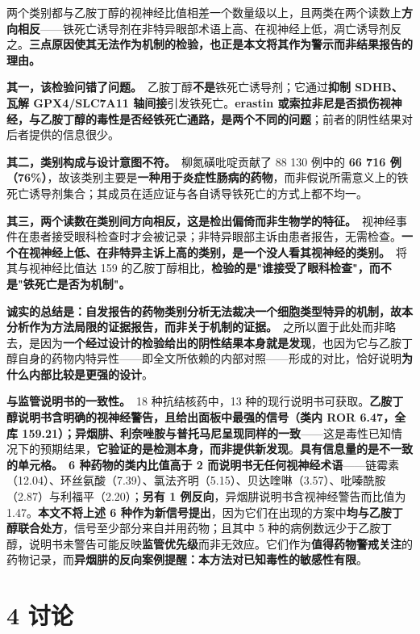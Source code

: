 \documentclass[UTF8,fontset=windows,11pt]{ctexart}
\begin{document}
两个类别都与乙胺丁醇的视神经比值相差一个数量级以上，且两类在两个读数上\textbf{方向相反}——铁死亡诱导剂在非特异眼部术语上高、在视神经上低，凋亡诱导剂反之。\textbf{三点原因使其无法作为机制的检验，也正是本文将其作为警示而非结果报告的理由。}

\textbf{其一，该检验问错了问题。}\ 乙胺丁醇\textbf{不是}铁死亡诱导剂；它通过\textbf{抑制 SDHB、瓦解 GPX4/SLC7A11 轴间接}引发铁死亡。\textbf{erastin 或索拉非尼是否损伤视神经，与乙胺丁醇的毒性是否经铁死亡通路，是两个不同的问题}；前者的阴性结果对后者提供的信息很少。

\textbf{其二，类别构成与设计意图不符。}\ 柳氮磺吡啶贡献了 88 130 例中的 \textbf{66 716 例（76\%）}，故该类别主要是\textbf{一种用于炎症性肠病的药物}，而非假说所需意义上的铁死亡诱导剂集合；其成员在适应证与各自诱导铁死亡的方式上都不均一。

\textbf{其三，两个读数在类别间方向相反，这是检出偏倚而非生物学的特征。}\ 视神经事件在患者接受眼科检查时才会被记录；非特异眼部主诉由患者报告，无需检查。\textbf{一个在视神经上低、在非特异主诉上高的类别，是一个没人看其视神经的类别。}\ 将其与视神经比值达 159 的乙胺丁醇相比，\textbf{检验的是"谁接受了眼科检查"，而不是"铁死亡是否为机制"。}

\textbf{诚实的总结是：自发报告的药物类别分析无法裁决一个细胞类型特异的机制，故本分析作为方法局限的证据报告，而非关于机制的证据。}\ 之所以置于此处而非略去，是因为\textbf{一个经过设计的检验给出的阴性结果本身就是发现}，也因为它与乙胺丁醇自身的药物内特异性——即全文所依赖的内部对照——形成的对比，恰好说明\textbf{为什么内部比较是更强的设计}。

\textbf{与监管说明书的一致性。}\ 18 种抗结核药中，13 种的现行说明书可获取。\textbf{乙胺丁醇说明书含明确的视神经警告，且给出面板中最强的信号（类内 ROR 6.47，全库 159.21）；异烟肼、利奈唑胺与普托马尼呈现同样的一致}——这是毒性已知情况下的预期结果，\textbf{它验证的是检测本身，而非提供新发现}。\textbf{具有信息量的是不一致的单元格。}\ \textbf{6 种药物的类内比值高于 2 而说明书无任何视神经术语}——链霉素（12.04）、环丝氨酸（7.39）、氯法齐明（5.15）、贝达喹啉（3.57）、吡嗪酰胺（2.87）与利福平（2.20）；\textbf{另有 1 例反向}，异烟肼说明书含视神经警告而比值为 1.47。\textbf{本文不将上述 6 种作为新信号提出}，因为它们在出现的方案中\textbf{均与乙胺丁醇联合处方}，信号至少部分来自并用药物；且其中 5 种的病例数远少于乙胺丁醇，说明书未警告可能反映\textbf{监管优先级}而非无效应。它们作为\textbf{值得药物警戒关注}的药物记录，而\textbf{异烟肼的反向案例提醒：本方法对已知毒性的敏感性有限}。

\section{4 讨论}
\end{document}
